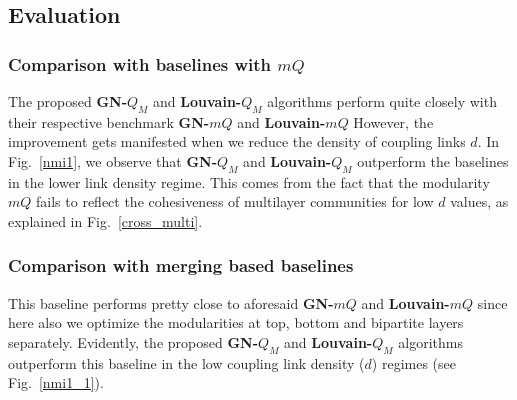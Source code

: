 
\subsection{Evaluation}
\subsubsection{Comparison with baselines with $mQ$}
The proposed \textbf{GN-$Q_M$} and \textbf{Louvain-$Q_M$} algorithms perform quite closely with their respective benchmark 
\textbf{GN-$mQ$} and
\textbf{Louvain-$mQ$}  However, the improvement gets manifested when we reduce the density
of coupling links $d$. In Fig.~\ref{nmi1}, we observe that \textbf{GN-$Q_M$} and \textbf{Louvain-$Q_M$} outperform the baselines in the
lower link density regime. This comes from the fact that the modularity $mQ$ fails to reflect the cohesiveness
of multilayer communities for low $d$ values, as explained in Fig.~\ref{cross_multi}.

\subsubsection{Comparison with merging based baselines}
This baseline
performs pretty close to aforesaid \textbf{GN-$mQ$} and \textbf{Louvain-$mQ$}  since here
also we optimize the
modularities at top, bottom and bipartite layers separately. Evidently, the proposed \textbf{GN-$Q_M$} and \textbf{Louvain-$Q_M$} 
algorithms outperform
this baseline in the low coupling link density ($d$) regimes (see Fig.~\ref{nmi1_1}).



